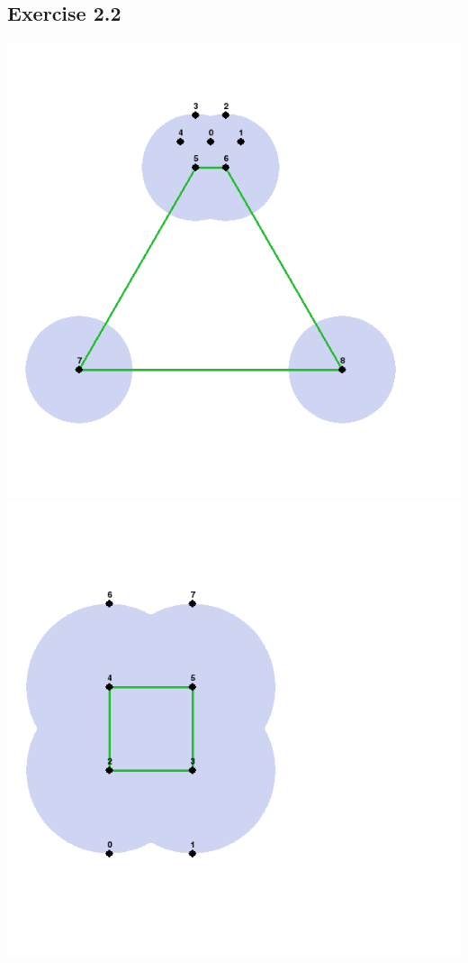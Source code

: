 \documentclass[11pt,a4paper]{article}
\begin{document}
\subsection{Exercise 2.2}
\includegraphics[width=\textwidth]{graph1.png}
\includegraphics[width=\textwidth]{graph2.png}
\end{document}
